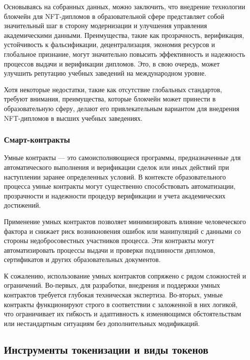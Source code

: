 Основываясь на собранных данных, можно заключить, что внедрение технологии блокчейн для NFT-дипломов в образовательной сфере представляет собой значительный шаг в сторону модернизации и улучшения управления академическими данными. Преимущества, такие как прозрачность, верификация, устойчивость к фальсификации, децентрализация, экономия ресурсов и глобальное признание, могут значительно повысить эффективность и надежность процессов выдачи и верификации дипломов. Это, в свою очередь, может улучшить репутацию учебных заведений на международном уровне.

Хотя некоторые недостатки, такие как отсутствие глобальных стандартов, требуют внимания, преимущества, которые блокчейн может принести в образовательную сферу, делают его привлекательным вариантом для внедрения NFT-дипломов в высших учебных заведениях.

\subsubsection{Смарт-контракты}

Умные контракты --- это самоисполняющиеся программы, предназначенные для автоматического выполнения и верификации сделок или иных действий при наступлении заранее определенных условий. В контексте образовательного процесса умные контракты могут существенно способствовать автоматизации, прозрачности и надежности процедур верификации и учета академических достижений.~\cite{bib:smart_contract}

Применение умных контрактов позволяет минимизировать влияние человеческого фактора и снижает риск возникновения ошибок или манипуляций с данными со стороны недобросовестных участников процесса. Эти контракты могут автоматизировать процессы выдачи и проверки подлинности дипломов, сертификатов и других образовательных документов.

К сожалению, использование умных контрактов сопряжено с рядом сложностей и ограничений. Во-первых, для разработки, внедрения и поддержки умных контрактов требуется глубокая техническая экспертиза. Во-вторых, умные контракты функционируют строго в соответствии с заложенной в них логикой, что ограничивает их гибкость и адаптивность к изменяющимся обстоятельствам или нестандартным ситуациям без дополнительных модификаций.

\subsection{Инструменты токенизации и виды токенов}

